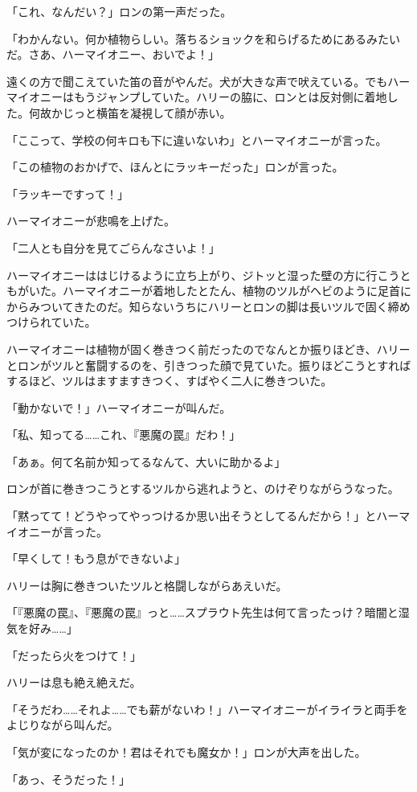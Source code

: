 \documentclass[10pt,a4paper]{article}
\begin{document}
\begin{CJK}{UTF8}{min}
「これ、なんだい？」ロンの第一声だった。

「わかんない。何か植物らしい。落ちるショックを和らげるためにあるみたいだ。さあ、ハーマイオニー、おいでよ！」

遠くの方で聞こえていた笛の音がやんだ。犬が大きな声で吠えている。でもハーマイオニーはもうジャンプしていた。ハリーの脇に、ロンとは反対側に着地した。何故かじっと横笛を凝視して顔が赤い。

「ここって、学校の何キロも下に違いないわ」とハーマイオニーが言った。

「この植物のおかげで、ほんとにラッキーだった」ロンが言った。

「ラッキーですって！」

ハーマイオニーが悲鳴を上げた。

「二人とも自分を見てごらんなさいよ！」

ハーマイオニーははじけるように立ち上がり、ジトッと湿った壁の方に行こうともがいた。ハーマイオニーが着地したとたん、植物のツルがヘビのように足首にからみついてきたのだ。知らないうちにハリーとロンの脚は長いツルで固く締めつけられていた。

ハーマイオニーは植物が固く巻きつく前だったのでなんとか振りほどき、ハリーとロンがツルと奮闘するのを、引きつった顔で見ていた。振りほどこうとすればするほど、ツルはますますきつく、すばやく二人に巻きついた。

「動かないで！」ハーマイオニーが叫んだ。

「私、知ってる……これ、『悪魔の罠』だわ！」

「あぁ。何て名前か知ってるなんて、大いに助かるよ」

ロンが首に巻きつこうとするツルから逃れようと、のけぞりながらうなった。

「黙ってて！どうやってやっつけるか思い出そうとしてるんだから！」とハーマイオニーが言った。

「早くして！もう息ができないよ」

ハリーは胸に巻きついたツルと格闘しながらあえいだ。

「『悪魔の罠』、『悪魔の罠』っと……スプラウト先生は何て言ったっけ？暗闇と湿気を好み……」

「だったら火をつけて！」

ハリーは息も絶え絶えだ。

「そうだわ……それよ……でも薪がないわ！」ハーマイオニーがイライラと両手をよじりながら叫んだ。

「気が変になったのか！君はそれでも魔女か！」ロンが大声を出した。

「あっ、そうだった！」


\end{CJK}
\end{document}
